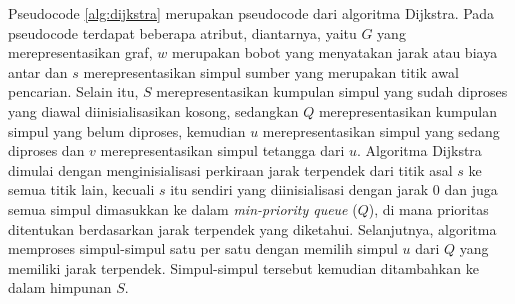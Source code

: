 Pseudocode \ref{alg:dijkstra} merupakan pseudocode dari algoritma Dijkstra. Pada pseudocode terdapat beberapa atribut, diantarnya, yaitu $G$ yang merepresentasikan graf, $w$ merupakan bobot yang menyatakan jarak atau biaya antar dan $s$ merepresentasikan simpul sumber yang merupakan titik awal pencarian. Selain itu, $S$ merepresentasikan kumpulan simpul yang sudah diproses yang diawal diinisialisasikan kosong, sedangkan $Q$ merepresentasikan kumpulan simpul yang belum diproses, kemudian $u$ merepresentasikan simpul yang sedang diproses dan $v$ merepresentasikan simpul tetangga dari $u$. Algoritma Dijkstra dimulai dengan menginisialisasi perkiraan jarak terpendek dari titik asal $s$ ke semua titik lain, kecuali $s$ itu sendiri yang diinisialisasi dengan jarak 0 dan juga semua simpul dimasukkan ke dalam \textit{min-priority queue} ($Q$), di mana prioritas ditentukan berdasarkan jarak terpendek yang diketahui. Selanjutnya, algoritma memproses simpul-simpul satu per satu dengan memilih simpul $u$ dari $Q$ yang memiliki jarak terpendek. Simpul-simpul tersebut kemudian ditambahkan ke dalam himpunan $S$.

